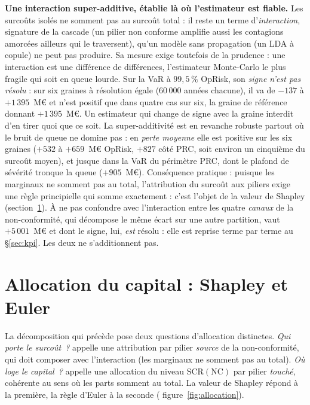 \begin{cle}
\textbf{Une interaction super-additive, établie là où l'estimateur est fiable.} Les surcoûts
isolés ne somment pas au surcoût total : il reste un terme d'\emph{interaction}, signature de la
cascade (un pilier non conforme amplifie aussi les contagions amorcées ailleurs qui le
traversent), qu'un modèle sans propagation (un LDA à copule) ne peut pas produire.
Sa mesure exige toutefois de la prudence : une interaction est une différence de différences,
l'estimateur Monte-Carlo le plus fragile qui soit en queue lourde. Sur la VaR à $99{,}5\,\%$
OpRisk, son \emph{signe n'est pas résolu} : sur six graines à résolution égale
($60\,000$ années chacune), il va de $-137$ à $+1\,395$~M\euro{} et n'est positif que dans
quatre cas sur six, la graine de référence donnant $+1\,395$~M\euro{}. Un estimateur
qui change de signe avec la graine interdit d'en tirer quoi que ce soit. La super-additivité
est en revanche robuste partout où le bruit de queue ne domine pas : en \emph{perte moyenne}
elle est positive sur les six graines ($+532$ à $+659$~M\euro{} OpRisk, $+827$
côté PRC, soit environ un cinquième du surcoût moyen), et jusque dans la VaR du périmètre PRC,
dont le plafond de sévérité tronque la queue ($+905$~M\euro{}). Conséquence pratique : puisque les
marginaux ne somment pas au total, l'attribution du surcoût aux piliers exige une règle
principielle qui somme exactement : c'est l'objet de la valeur de Shapley
(section~\ref{sec:allocation}). À ne pas confondre avec l'interaction entre les quatre
\emph{canaux} de la non-conformité, qui décompose le même écart sur une autre partition, vaut
$+5\,001$~M\euro{} et dont le signe, lui, \emph{est} résolu : elle est reprise terme par terme au
\S\ref{sec:kpi}. Les deux ne s'additionnent pas.
\end{cle}

\section{Allocation du capital : Shapley et Euler}
\label{sec:allocation}

La décomposition qui précède pose deux questions d'allocation distinctes. \emph{Qui porte le
surcoût~?} appelle une attribution par pilier \emph{source} de la non-conformité, qui doit
composer avec l'interaction (les marginaux ne somment pas au total). \emph{Où loge le
capital~?} appelle une allocation du niveau $\mathrm{SCR}(\text{NC})$ par pilier
\emph{touché}, cohérente au sens où les parts somment au total. La valeur de Shapley répond
à la première, la règle d'Euler à la seconde (%
figure~\ref{fig:allocation}).

